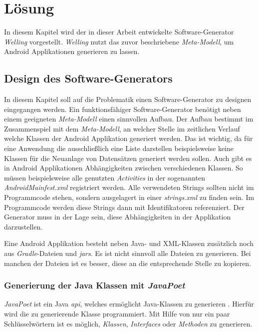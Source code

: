 \chapter{Lösung}
In diesem Kapitel wird der in dieser Arbeit entwickelte Software-Generator \textit{Welling} vorgestellt. \textit{Welling} nutzt das zuvor beschriebene \textit{Meta-Modell}, um Android Applikationen generieren zu lassen. 

\section{Design des Software-Generators}
In diesem Kapitel soll auf die Problematik einen Software-Generator zu designen eingegangen werden. Ein funktionsfähiger Software-Generator benötigt neben einem geeigneten \textit{Meta-Modell} einen sinnvollen Aufbau. Der Aufbau bestimmt im Zusammenspiel mit dem \textit{Meta-Modell}, an welcher Stelle im zeitlichen Verlauf welche Klassen der Android Applikation generiert werden. Das ist wichtig, da für eine Anwendung die ausschließlich eine Liste darstellen beispielsweise keine Klassen für die Neuanlage von Datensätzen generiert werden sollen. 
Auch gibt es in Android Applikationen Abhängigkeiten zwischen verschiedenen Klassen. So müssen beispielsweise alle genutzten \textit{Activities} in der sogenannten \textit{AndroidMainfest.xml} registriert werden. Alle verwendeten Strings sollten nicht im Programmcode stehen, sondern ausgelagert in einer \textit{strings.xml} zu finden sein. Im Programmcode werden diese Strings dann mit Identifikatoren referenziert. Der Generator muss in der Lage sein, diese Abhängigkeiten in der Applikation darzustellen. 

Eine Android Applikation besteht neben Java- und XML-Klassen zusätzlich noch aus \textit{Gradle}-Dateien und \textit{\acfp{jar}}. Es ist nicht sinnvoll alle Dateien zu generieren. Bei manchen der Dateien ist es besser, diese an die entsprechende Stelle zu kopieren.

\subsection{Generierung der Java Klassen mit \textit{JavaPoet}}
\textit{JavaPoet} ist ein Java \textit{\ac{api}}, welches ermöglicht Java-Klassen zu generieren \cite{poet}. Hierfür wird die zu generierende Klasse programmiert. Mit Hilfe von nur ein paar Schlüsselwörtern ist es möglich, \textit{Klassen}, \textit{Interfaces} oder \textit{Methoden} zu generieren. 


